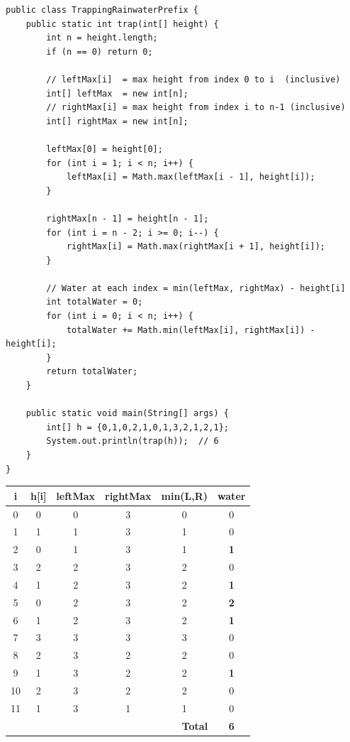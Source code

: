 \documentclass[12pt,a4paper,oneside]{book}
\begin{document}
\begin{lstlisting}[caption={Trapping Rainwater --- Prefix Arrays O(n)}]
public class TrappingRainwaterPrefix {
    public static int trap(int[] height) {
        int n = height.length;
        if (n == 0) return 0;

        // leftMax[i]  = max height from index 0 to i  (inclusive)
        int[] leftMax  = new int[n];
        // rightMax[i] = max height from index i to n-1 (inclusive)
        int[] rightMax = new int[n];

        leftMax[0] = height[0];
        for (int i = 1; i < n; i++) {
            leftMax[i] = Math.max(leftMax[i - 1], height[i]);
        }

        rightMax[n - 1] = height[n - 1];
        for (int i = n - 2; i >= 0; i--) {
            rightMax[i] = Math.max(rightMax[i + 1], height[i]);
        }

        // Water at each index = min(leftMax, rightMax) - height[i]
        int totalWater = 0;
        for (int i = 0; i < n; i++) {
            totalWater += Math.min(leftMax[i], rightMax[i]) - height[i];
        }
        return totalWater;
    }

    public static void main(String[] args) {
        int[] h = {0,1,0,2,1,0,1,3,2,1,2,1};
        System.out.println(trap(h));  // 6
    }
}
\end{lstlisting}

\begin{dryrun}[height = \{0,1,0,2,1,0,1,3,2,1,2,1\}]
\begin{center}
\begin{tabular}{cccccc}
\toprule
\textbf{i} & \textbf{h[i]} & \textbf{leftMax} & \textbf{rightMax} & \textbf{min(L,R)} & \textbf{water}\\
\midrule
0 & 0 & 0 & 3 & 0 & 0\\
1 & 1 & 1 & 3 & 1 & 0\\
2 & 0 & 1 & 3 & 1 & \textbf{1}\\
3 & 2 & 2 & 3 & 2 & 0\\
4 & 1 & 2 & 3 & 2 & \textbf{1}\\
5 & 0 & 2 & 3 & 2 & \textbf{2}\\
6 & 1 & 2 & 3 & 2 & \textbf{1}\\
7 & 3 & 3 & 3 & 3 & 0\\
8 & 2 & 3 & 2 & 2 & 0\\
9 & 1 & 3 & 2 & 2 & \textbf{1}\\
10& 2 & 3 & 2 & 2 & 0\\
11& 1 & 3 & 1 & 1 & 0\\
\midrule
\multicolumn{5}{r}{\textbf{Total}} & \textbf{6}\\
\bottomrule
\end{tabular}
\end{center}
\end{dryrun}
\end{document}

